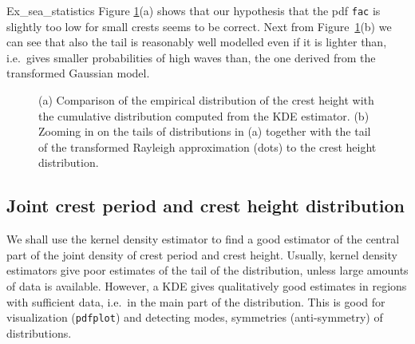 \begin{cex}{Ex_sea_statistics}
Figure \ref{fig_Ac1}(a) shows that our hypothesis that the pdf {\tt fac}
is slightly too low for small crests seems to be correct. Next
from Figure~\ref{fig_Ac1}(b) we can see that also the tail is
reasonably well modelled even if it is lighter than, i.e.\ gives smaller
probabilities of high waves than, the one derived from the transformed
Gaussian model.
\end{cex}

\begin{figure}
%
\hfill
{}%
\vspace{-3mm}
  \caption[Comparing different crest height models]{
(a) Comparison of the empirical distribution of the crest height with
the cumulative distribution computed from the KDE estimator.
(b) Zooming in on the tails of distributions in (a) together with
the tail of the transformed Rayleigh approximation (dots) to the crest
height distribution.
}
  \label{fig_Ac1}
\end{figure}

\subsection{Joint crest period and crest height distribution}
We shall use the kernel density estimator to find a good estimator of
the central part of the joint density of crest period and crest
height. Usually, kernel density estimators give poor estimates
of the tail of the distribution, unless large amounts of data is
available. However, a KDE gives qualitatively good estimates in
regions with sufficient data, i.e.\, in the  main part of the
distribution. This is good for visualization (\verb+pdfplot+) and detecting
modes, symmetries (anti-symmetry) of distributions.

